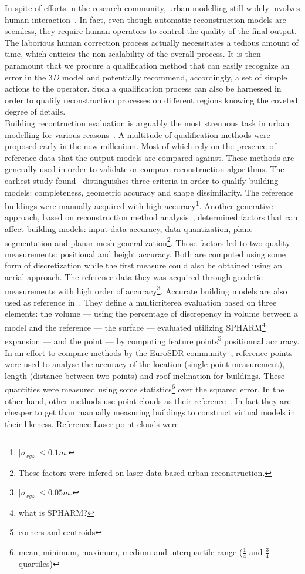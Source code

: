 \documentclass[../main.tex]{subfiles}
\begin{document}
    In spite of efforts in the research community, urban modelling still widely involves human interaction~\cite{Musialski2012}. In fact, even though automatic reconstruction models are seemless, they require human operators to control the quality of the final output. The laborious human correction process actually necessitates a tedious amount of time, which enticies the non-scalability of the overall process. It is then paramount that we procure a qualification method that can easily recognize an error in the $3D$ model and potentially recommend, accordingly, a set of simple actions to the operator. Such a qualification process can also be harnessed in order to qualify reconstruction processes on different regions knowing the coveted degree of details.\\

    Building recontruction evaluation is arguably the most strenuous task in urban modelling for various reasons~\cite{Lafarge2012}. A multitude of qualification methods were proposed early in the new millenium. Most of which rely on the presence of reference data that the output models are compared against. These methods are generally used in order to validate or compare reconstruction algorithms. The earliest study found~\cite{Henricsson1997} distinguishes three criteria in order to qualify building models: completeness, geometric accuracy and shape dissimilarity. The reference buildings were manually acquired with high accuracy\footnote{$ \vert \sigma_{xyz} \vert \leq 0.1 m$.}. Another generative approach, based on reconstruction method analysis~\cite{Voegtle2003}, determined factors that can affect building models: input data accuracy, data quantization, plane segmentation and planar mesh generalization\footnote{These factors were infered on laser data based urban reconstruction.}. Those factors led to two quality measurements: positional and height accuracy. Both are computed using some form of discretization while the first measure could also be obtained using an aerial approach. The reference data they was acquired through geodetic measurements with high order of accuracy\footnote{$ \vert \sigma_{xyz} \vert \leq 0.05 m $.}. Accurate building models are also used as reference in~\cite{Zeng2014}. They define a multicriterea evaluation based on three elements: the volume --- using the percentage of discrepency in volume between a model and the reference --- the surface --- evaluated utilizing SPHARM\footnote{what is SPHARM?} expansion --- and the point --- by computing feature points\footnote{corners and centroids} positionnal accuracy. In an effort to compare methods by the EuroSDR community~\cite{Kaartinen2005}, reference points were used to analyse the accuracy of the location (single point measurement), length (distance between two points) and roof inclination for buildings. These quantities were measured using some statistics\footnote{mean, minimum, maximum, medium and interquartile range ($\frac{1}{4}$ and $\frac{3}{4}$ quartiles)} over the squared error. In the other hand, other methods use point clouds as their reference~\cite{Lafarge2012}. In fact they are cheaper to get than manually measuring buildings to construct virtual models in their likeness. Reference Laser point clouds were 
\end{document}
